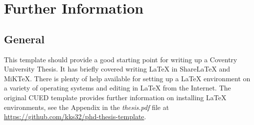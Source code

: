 \chapter{Further Information}

\section*{General}

This template should provide a good starting point for writing up a Coventry University Thesis. It has briefly covered writing \LaTeX{} in ShareLaTeX and MiKTeX. There is plenty of help available for setting up a \LaTeX{} environment on a variety of operating systems and editing in \LaTeX{} from the Internet. The original CUED template provides further information on installing \LaTeX{} environments, see the Appendix in the \textit{thesis.pdf} file at \url{https://github.com/kks32/phd-thesis-template}.

